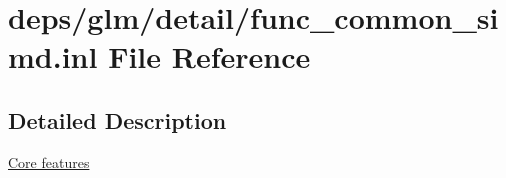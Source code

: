 \hypertarget{func__common__simd_8inl}{}\section{deps/glm/detail/func\+\_\+common\+\_\+simd.inl File Reference}
\label{func__common__simd_8inl}


\subsection{Detailed Description}
\hyperlink{group__core}{Core features} 
